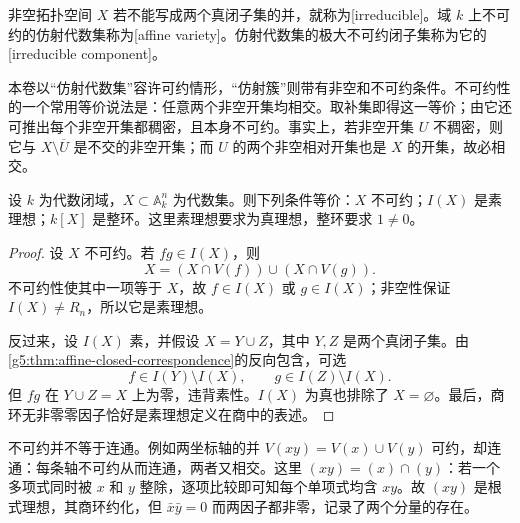 \begin{definition}\label{g5:def:irreducible-affine}
	非空拓扑空间 \(X\) 若不能写成两个真闭子集的并，就称为[irreducible]。域 \(k\) 上不可约的仿射代数集称为[affine variety]。仿射代数集的极大不可约闭子集称为它的[irreducible component]。
\end{definition}

本卷以“仿射代数集”容许可约情形，“仿射簇”则带有非空和不可约条件。不可约性的一个常用等价说法是：任意两个非空开集均相交。取补集即得这一等价；由它还可推出每个非空开集都稠密，且本身不可约。事实上，若非空开集 \(U\) 不稠密，则它与 \(X\setminus\overline U\) 是不交的非空开集；而 \(U\) 的两个非空相对开集也是 \(X\) 的开集，故必相交。

\begin{proposition}\label{g5:prop:irreducible-prime}
	设 \(k\) 为代数闭域，\(X\subset\mathbb A_k^n\) 为代数集。则下列条件等价：\(X\) 不可约；\(I(X)\) 是素理想；\(k[X]\) 是整环。这里素理想要求为真理想，整环要求 \(1\ne0\)。
\end{proposition}
\begin{proof}
	设 \(X\) 不可约。若 \(fg\in I(X)\)，则
	\[
		X=(X\cap V(f))\cup(X\cap V(g)).
	\]
	不可约性使其中一项等于 \(X\)，故 \(f\in I(X)\) 或 \(g\in I(X)\)；非空性保证 \(I(X)\ne R_n\)，所以它是素理想。

	反过来，设 \(I(X)\) 素，并假设 \(X=Y\cup Z\)，其中 \(Y,Z\) 是两个真闭子集。由\cref{g5:thm:affine-closed-correspondence}的反向包含，可选
	\[
		f\in I(Y)\setminus I(X),\qquad g\in I(Z)\setminus I(X).
	\]
	但 \(fg\) 在 \(Y\cup Z=X\) 上为零，违背素性。\(I(X)\) 为真也排除了 \(X=\varnothing\)。最后，商环无非零零因子恰好是素理想定义在商中的表述。
\end{proof}

不可约并不等于连通。例如两坐标轴的并 \(V(xy)=V(x)\cup V(y)\) 可约，却连通：每条轴不可约从而连通，两者又相交。这里 \((xy)=(x)\cap(y)\)：若一个多项式同时被 \(x\) 和 \(y\) 整除，逐项比较即可知每个单项式均含 \(xy\)。故 \((xy)\) 是根式理想，其商环约化，但 \(\bar x\bar y=0\) 而两因子都非零，记录了两个分量的存在。

